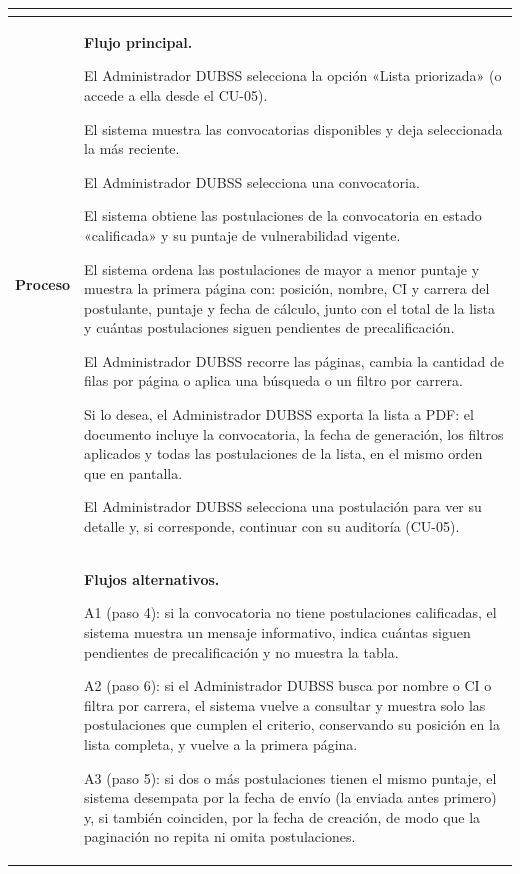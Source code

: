 \begin{longtable}{>{\raggedright\arraybackslash}p{2.9cm} >{\raggedright\arraybackslash}p{12.6cm}}
\begin{cuvin}
\end{cuvin} \\
\midrule
\textbf{Proceso} & \textbf{Flujo principal.}
\begin{cupasos}
    \item El Administrador DUBSS selecciona la opción «Lista priorizada» (o accede a ella desde el CU-05).
    \item El sistema muestra las convocatorias disponibles y deja seleccionada la más reciente.
    \item El Administrador DUBSS selecciona una convocatoria.
    \item El sistema obtiene las postulaciones de la convocatoria en estado «calificada» y su puntaje de vulnerabilidad vigente.
    \item El sistema ordena las postulaciones de mayor a menor puntaje y muestra la primera página con: posición, nombre, CI y carrera del postulante, puntaje y fecha de cálculo, junto con el total de la lista y cuántas postulaciones siguen pendientes de precalificación.
    \item El Administrador DUBSS recorre las páginas, cambia la cantidad de filas por página o aplica una búsqueda o un filtro por carrera.
    \item Si lo desea, el Administrador DUBSS exporta la lista a PDF: el documento incluye la convocatoria, la fecha de generación, los filtros aplicados y todas las postulaciones de la lista, en el mismo orden que en pantalla.
    \item El Administrador DUBSS selecciona una postulación para ver su detalle y, si corresponde, continuar con su auditoría (CU-05).
\end{cupasos} \\
 & \textbf{Flujos alternativos.}
\begin{cuvin}
    \item A1 (paso 4): si la convocatoria no tiene postulaciones calificadas, el sistema muestra un mensaje informativo, indica cuántas siguen pendientes de precalificación y no muestra la tabla.
    \item A2 (paso 6): si el Administrador DUBSS busca por nombre o CI o filtra por carrera, el sistema vuelve a consultar y muestra solo las postulaciones que cumplen el criterio, conservando su posición en la lista completa, y vuelve a la primera página.
    \item A3 (paso 5): si dos o más postulaciones tienen el mismo puntaje, el sistema desempata por la fecha de envío (la enviada antes primero) y, si también coinciden, por la fecha de creación, de modo que la paginación no repita ni omita postulaciones.

\end{cuvin}
\end{longtable}
